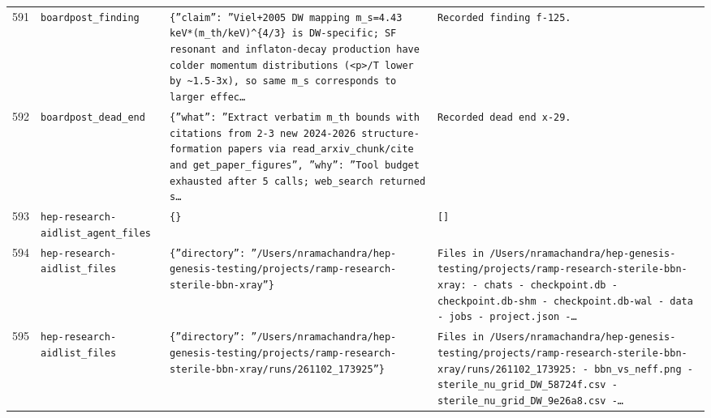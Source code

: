 \documentclass[11pt,a4paper]{article}
\begin{document}
\begin{longtable}{@{}p{}p{}p{}p{}@{}}
591 & \texttt{board}\newline\texttt{post\_\allowbreak{}finding} & \texttt{\{''claim'':\allowbreak{} ''Viel+2005 DW mapping m\_\allowbreak{}s=\allowbreak{}4.43 keV*(m\_\allowbreak{}th/\allowbreak{}keV)\allowbreak{}\textasciicircum{}\allowbreak{}\{4/\allowbreak{}3\}\allowbreak{} is DW-specific;\allowbreak{} SF resonant and inflaton-decay production have colder momentum distributions (\textless{}\allowbreak{}p\textgreater{}\allowbreak{}/\allowbreak{}T lower by \textasciitilde{}\allowbreak{}1.5-3x)\allowbreak{},\allowbreak{} so same m\_\allowbreak{}s corresponds to larger effec\ldots{}\allowbreak{}} & \texttt{Recorded finding f-125.} \\
592 & \texttt{board}\newline\texttt{post\_\allowbreak{}dead\_\allowbreak{}end} & \texttt{\{''what'':\allowbreak{} ''Extract verbatim m\_\allowbreak{}th bounds with citations from 2-3 new 2024-2026 structure-formation papers via read\_\allowbreak{}arxiv\_\allowbreak{}chunk/\allowbreak{}cite and get\_\allowbreak{}paper\_\allowbreak{}figures'',\allowbreak{} ''why'':\allowbreak{} ''Tool budget exhausted after 5 calls;\allowbreak{} web\_\allowbreak{}search returned s\ldots{}\allowbreak{}} & \texttt{Recorded dead end x-29.} \\
593 & \texttt{hep-research-aid}\newline\texttt{list\_\allowbreak{}agent\_\allowbreak{}files} & \texttt{\{\}\allowbreak{}} & \texttt{[]\allowbreak{}} \\
594 & \texttt{hep-research-aid}\newline\texttt{list\_\allowbreak{}files} & \texttt{\{''directory'':\allowbreak{} ''/\allowbreak{}Users/\allowbreak{}nramachandra/\allowbreak{}hep-genesis-testing/\allowbreak{}projects/\allowbreak{}ramp-research-sterile-bbn-xray''\}\allowbreak{}} & \texttt{Files in /\allowbreak{}Users/\allowbreak{}nramachandra/\allowbreak{}hep-genesis-testing/\allowbreak{}projects/\allowbreak{}ramp-research-sterile-bbn-xray:\allowbreak{}   - chats   - checkpoint.db   - checkpoint.db-shm   - checkpoint.db-wal   - data   - jobs   - project.json   -\ldots{}\allowbreak{}} \\
595 & \texttt{hep-research-aid}\newline\texttt{list\_\allowbreak{}files} & \texttt{\{''directory'':\allowbreak{} ''/\allowbreak{}Users/\allowbreak{}nramachandra/\allowbreak{}hep-genesis-testing/\allowbreak{}projects/\allowbreak{}ramp-research-sterile-bbn-xray/\allowbreak{}runs/\allowbreak{}261102\_\allowbreak{}173925''\}\allowbreak{}} & \texttt{Files in /\allowbreak{}Users/\allowbreak{}nramachandra/\allowbreak{}hep-genesis-testing/\allowbreak{}projects/\allowbreak{}ramp-research-sterile-bbn-xray/\allowbreak{}runs/\allowbreak{}261102\_\allowbreak{}173925:\allowbreak{}   - bbn\_\allowbreak{}vs\_\allowbreak{}neff.png   - sterile\_\allowbreak{}nu\_\allowbreak{}grid\_\allowbreak{}DW\_\allowbreak{}58724f.csv   - sterile\_\allowbreak{}nu\_\allowbreak{}grid\_\allowbreak{}DW\_\allowbreak{}9e26a8.csv   -\ldots{}\allowbreak{}} \\

\end{longtable}
\end{document}
